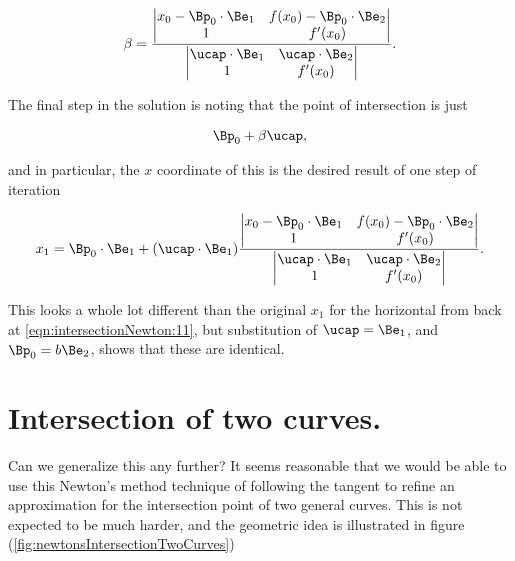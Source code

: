 \begin{align}\label{eqn:intersectionNewton:26c}
\beta = 
\frac{
\begin{vmatrix}
x_0 -\Bp_0 \cdot \Be_1 & f(x_0) - \Bp_0 \cdot \Be_2 \\
1 & f'(x_0) \\
\end{vmatrix}
}
{
\begin{vmatrix}
\ucap \cdot \Be_1 & \ucap \cdot \Be_2 \\
1 & f'(x_0) \\
\end{vmatrix}
}.
\end{align}

The final step in the solution is noting that the point of intersection is just

\begin{align}\label{eqn:intersectionNewton:27}
\Bp_0 + \beta \ucap,
\end{align}

and in particular, the $x$ coordinate of this is the desired result of one step of iteration

\begin{align}\label{eqn:intersectionNewton:28}
x_1 = \Bp_0 \cdot \Be_1 + (\ucap \cdot \Be_1)
\frac{
\begin{vmatrix}
x_0 -\Bp_0 \cdot \Be_1 & f(x_0) - \Bp_0 \cdot \Be_2 \\
1 & f'(x_0) \\
\end{vmatrix}
}
{
\begin{vmatrix}
\ucap \cdot \Be_1 & \ucap \cdot \Be_2 \\
1 & f'(x_0) \\
\end{vmatrix}
}.
\end{align}

This looks a whole lot different than the original $x_1$ for the horizontal from back at \ref{eqn:intersectionNewton:11}, but substitution of $\ucap = \Be_1$, and $\Bp_0 = b \Be_2$, shows that these are identical.

\section{Intersection of two curves.}

Can we generalize this any further?  It seems reasonable that we would be able to use this Newton's method technique of following the tangent to refine an approximation for the intersection point of two general curves.  This is not expected to be much harder, and the geometric idea is illustrated in figure (\ref{fig:newtonsIntersectionTwoCurves})

